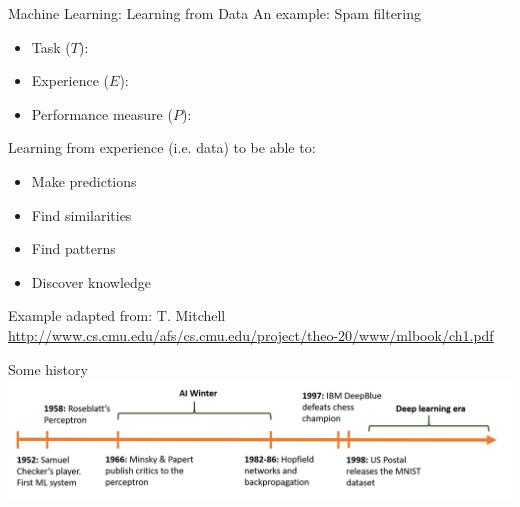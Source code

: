 \documentclass[aspectratio=169,10pt]{beamer}
\begin{document}
\begin{frame}{Machine Learning: Learning from Data}
	\alert{An example:} Spam filtering
	\begin{itemize}
		\item Task ($T$):
		\item Experience ($E$):
		\item Performance measure ($P$):
	\end{itemize}

\pause
Learning from experience (i.e. data) to be able to:
\begin{itemize}
	\item Make predictions
	\item Find similarities
	\item Find patterns 
	\item Discover knowledge
\end{itemize}

{\tiny Example adapted from: T. Mitchell \url{http://www.cs.cmu.edu/afs/cs.cmu.edu/project/theo-20/www/mlbook/ch1.pdf}}
\end{frame}

\begin{frame}{Some history}
	\centering
	\includegraphics[width=\linewidth, clip]{images/ai_history}
\end{frame}
\end{document}

